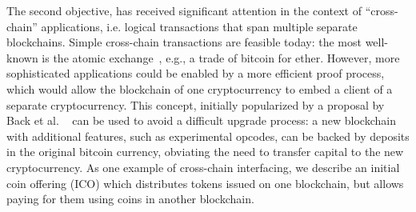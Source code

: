 %
The second objective, has received  significant attention in the context of
``cross-chain'' applications, i.e. logical transactions that span multiple
separate blockchains. Simple cross-chain transactions are feasible today: the
most well-known is the atomic exchange~\cite{tiernolan}, e.g., a trade of
bitcoin for ether. However, more sophisticated applications could be enabled
by a more efficient proof process, which would allow the blockchain of one cryptocurrency to embed a
client of a separate cryptocurrency. This concept, initially popularized by a
proposal by Back et al. ~\cite{sidechains}
can be used to avoid a difficult
upgrade process: a new blockchain with additional features, such as experimental
opcodes, can be backed by deposits in the original bitcoin currency, obviating
the need to transfer capital to the new cryptocurrency. As one example of
cross-chain interfacing, we describe an initial coin offering (ICO) which distributes tokens issued on
one blockchain, but allows paying for them using coins in another blockchain.


